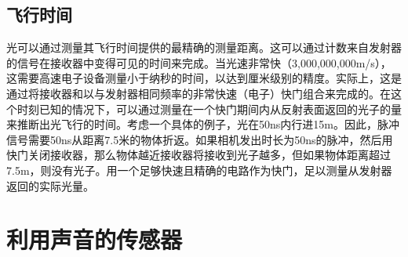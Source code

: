 \subsection{飞行时间}

光可以通过测量其飞行时间提供的最精确的测量距离。这可以通过计数来自发射器的信号在接收器中变得可见的时间来完成。当光速非常快（3,000,000,000m/s），这需要高速电子设备测量小于纳秒的时间，以达到厘米级别的精度。实际上，这是通过将接收器和以与发射器相同频率的非常快速（电子）快门组合来完成的。在这个时刻已知的情况下，可以通过测量在一个快门期间内从反射表面返回的光子的量来推断出光飞行的时间。考虑一个具体的例子，光在50ns内行进15m。因此，脉冲信号需要50ns从距离7.5米的物体折返。如果相机发出时长为50ns的脉冲，然后用快门关闭接收器，那么物体越近接收器将接收到光子越多，但如果物体距离超过7.5m，则没有光​​子。用一个足够快速且精确的电路作为快门，足以测量从发射器返回的实际光量。


\section{利用声音的传感器}
